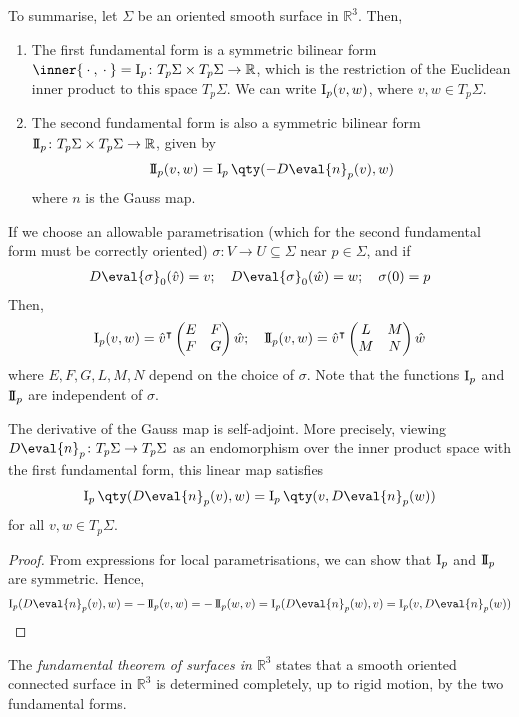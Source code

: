 \begin{remark}
	To summarise, let $\Sigma$ be an oriented smooth surface in $\mathbb R^3$.
	Then,
	\begin{enumerate}
		\item The first fundamental form is a symmetric bilinear form $\inner{\wildcard,\wildcard} = \Iff_p \colon T_p \Sigma \times T_p \Sigma \to \mathbb R$, which is the restriction of the Euclidean inner product to this space $T_p \Sigma$.
		      We can write $\operatorname{\mathrm{I}}_p(v,w)$, where $v, w \in T_p \Sigma$.
		\item The second fundamental form is also a symmetric bilinear form $\operatorname{\mathrm{I\!I}}_p \colon T_p \Sigma \times T_p \Sigma \to \mathbb R$, given by
		      \begin{align*}
			      \IIff_p(v,w) = \Iff_p\qty(-D\eval{n}_p(v), w)
		      \end{align*}
		      where $n$ is the Gauss map.
	\end{enumerate}
	If we choose an allowable parametrisation (which for the second fundamental form must be correctly oriented) $\sigma \colon V \to U \subseteq \Sigma$ near $p \in \Sigma$, and if
	\begin{align*}
		D \eval{\sigma}_0(\hat v) = v;\quad D \eval{\sigma}_0(\hat w) = w;\quad \sigma(0) = p
	\end{align*}
	Then,
	\begin{align*}
		\operatorname{\mathrm{I}}_p(v,w) = {\hat v}^\intercal \begin{pmatrix}
			E & F \\
			F & G
		\end{pmatrix} \hat w;\quad \operatorname{\mathrm{I\!I}}_p(v,w) = {\hat v}^\intercal \begin{pmatrix}
			L & M \\
			M & N
		\end{pmatrix} \hat w
	\end{align*}
	where $E, F, G, L, M, N$ depend on the choice of $\sigma$.
	Note that the functions $\operatorname{\mathrm{I}}_p$ and $\operatorname{\mathrm{I\!I}}_p$ are independent of $\sigma$.
\end{remark}
\begin{lemma}
	The derivative of the Gauss map is self-adjoint.
	More precisely, viewing $D \eval{n}_p \colon T_p \Sigma \to T_p \Sigma$ as an endomorphism over the inner product space with the first fundamental form, this linear map satisfies
	\begin{align*}
		\Iff_p\qty(D \eval{n}_p(v), w) = \Iff_p\qty(v, D \eval{n}_p(w))
	\end{align*}
	for all $v, w \in T_p \Sigma$.
\end{lemma}
\begin{proof}
	From expressions for local parametrisations, we can show that $\operatorname{\mathrm{I}}_p$ and $\operatorname{\mathrm{I\!I}}_p$ are symmetric.
	Hence,
	\begin{align*}
		\Iff_p(D\eval{n}_p(v),w) = -\IIff_p(v,w) = -\IIff_p(w,v) = \Iff_p(D \eval{n}_p(w),v) = \Iff_p(v,D\eval{n}_p(w))
	\end{align*}
\end{proof}
\begin{remark}
	The \textit{fundamental theorem of surfaces in $\mathbb R^3$} states that a smooth oriented connected surface in $\mathbb R^3$ is determined completely, up to rigid motion, by the two fundamental forms.
\end{remark}

